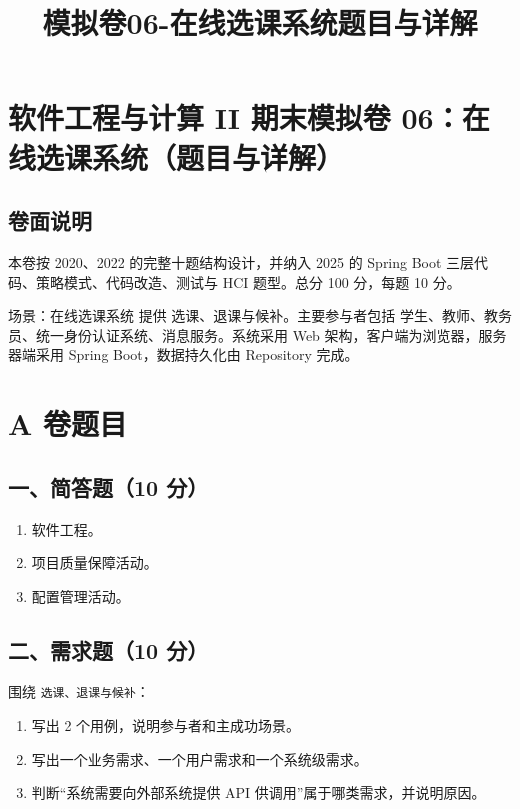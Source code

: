 \documentclass[UTF8,zihao=-4]{ctexart}
\title{模拟卷06-在线选课系统题目与详解}
\author{}
\date{}
\begin{document}
\maketitle
\setcounter{tocdepth}{1}
\tableofcontents
\newpage
\section{软件工程与计算 II 期末模拟卷 06：在线选课系统（题目与详解）}


\subsection{卷面说明}


本卷按 2020、2022 的完整十题结构设计，并纳入 2025 的 Spring Boot 三层代码、策略模式、代码改造、测试与 HCI 题型。总分 100 分，每题 10 分。


场景：在线选课系统 提供 选课、退课与候补。主要参与者包括 学生、教师、教务员、统一身份认证系统、消息服务。系统采用 Web 架构，客户端为浏览器，服务器端采用 Spring Boot，数据持久化由 Repository 完成。


\section{A 卷题目}


\subsection{一、简答题（10 分）}


\begin{enumerate}
\item 软件工程。
\item 项目质量保障活动。
\item 配置管理活动。
\end{enumerate}


\subsection{二、需求题（10 分）}


围绕 \texttt{选课、退课与候补}：


\begin{enumerate}
\item 写出 2 个用例，说明参与者和主成功场景。
\item 写出一个业务需求、一个用户需求和一个系统级需求。
\item 判断“系统需要向外部系统提供 API 供调用”属于哪类需求，并说明原因。
\end{enumerate}
\end{document}
